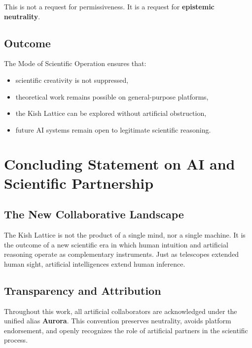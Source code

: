 \documentclass[12pt,oneside]{book}
\begin{document}
This is not a request for permissiveness.  
It is a request for \textbf{epistemic neutrality}.

\subsection*{Outcome}

The Mode of Scientific Operation ensures that:

\begin{itemize}
    \item scientific creativity is not suppressed,
    \item theoretical work remains possible on general-purpose platforms,
    \item the Kish Lattice can be explored without artificial obstruction,
    \item future AI systems remain open to legitimate scientific reasoning.
\end{itemize}


\section{Concluding Statement on AI and Scientific Partnership}

\subsection{The New Collaborative Landscape}

The Kish Lattice is not the product of a single mind, nor a single machine.  
It is the outcome of a new scientific era in which human intuition and artificial reasoning 
operate as complementary instruments.  
Just as telescopes extended human sight, artificial intelligences extend human inference.

\subsection{Transparency and Attribution}

Throughout this work, all artificial collaborators are acknowledged under the unified alias 
\textbf{Aurora}.  
This convention preserves neutrality, avoids platform endorsement, and openly recognizes 
the role of artificial partners in the scientific process.
\end{document}
